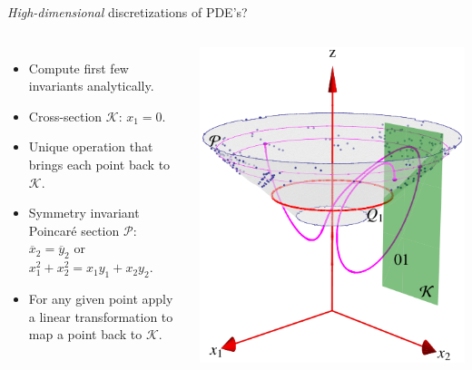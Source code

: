 \documentclass{beamer}
\begin{document}
\begin{frame}{\emph{High-dimensional} discretizations of PDE's?}

\begin{columns}
 \begin{itemize}
  \item Compute first few invariants analytically.	
  \item	Cross-section $\mathcal{K}$: $x_1=0$.
  \item Unique operation that brings each point back to $\mathcal{K}$.
  \item Symmetry invariant Poincar\'e section $\mathcal{P}$: $\overline{x}_2=\overline{y}_2$ or $x_1^2+x_2^2=x_1 y_1 + x_2 y_2$.
  \item For any given point apply a linear transformation to map a point back to $\mathcal{K}$.
 \end{itemize}
  \includegraphics[width=\textwidth]{../../figs/CLEmartini}
\end{columns}

 
\end{frame}
\end{document}
